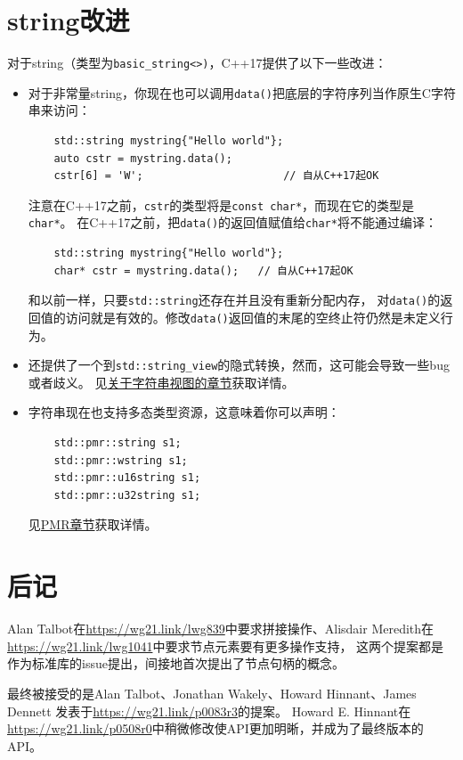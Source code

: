 \section{string改进}
对于string（类型为\texttt{basic\_string<>)}，C++17提供了以下一些改进：
\begin{itemize}
    \item 对于非常量string，你现在也可以调用\texttt{data()}把底层的字符序列当作原生C字符串来访问：
    \begin{lstlisting}
    std::string mystring{"Hello world"};
    auto cstr = mystring.data();
    cstr[6] = 'W';                      // 自从C++17起OK
    \end{lstlisting}
    注意在C++17之前，\texttt{cstr}的类型将是\texttt{const char*}，而现在它的类型是\texttt{char*}。
    在C++17之前，把\texttt{data()}的返回值赋值给\texttt{char*}将不能通过编译：
    \begin{lstlisting}
    std::string mystring{"Hello world"};
    char* cstr = mystring.data();   // 自从C++17起OK
    \end{lstlisting}
    和以前一样，只要\texttt{std::string}还存在并且没有重新分配内存，
    对\texttt{data()}的返回值的访问就是有效的。修改\texttt{data()}返回值的末尾的空终止符仍然是未定义行为。
    \item 还提供了一个到\texttt{std::string\_view}的隐式转换，然而，这可能会导致一些bug或者歧义。
    见\hyperref[ch19]{关于字符串视图的章节}获取详情。
    \item 字符串现在也支持多态类型资源，这意味着你可以声明：
    \begin{lstlisting}
    std::pmr::string s1;
    std::pmr::wstring s1;
    std::pmr::u16string s1;
    std::pmr::u32string s1;
    \end{lstlisting}
    见\hyperref[ch29]{PMR章节}获取详情。
\end{itemize}


\section{后记}
Alan Talbot在\url{https://wg21.link/lwg839}中要求拼接操作、Alisdair Meredith在\\
\url{https://wg21.link/lwg1041}中要求节点元素要有更多操作支持，
这两个提案都是作为标准库的issue提出，间接地首次提出了节点句柄的概念。

最终被接受的是Alan Talbot、Jonathan Wakely、Howard Hinnant、James Dennett
发表于\url{https://wg21.link/p0083r3}的提案。
Howard E. Hinnant在\url{https://wg21.link/p0508r0}中稍微修改使API更加明晰，并成为了最终版本的API。

